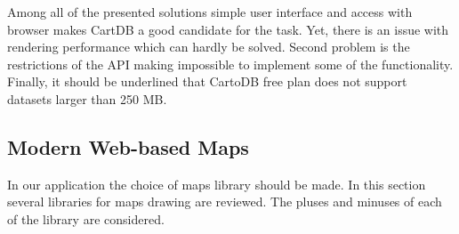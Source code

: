 Among all of the presented solutions simple user interface and access with browser makes CartDB a
good candidate for the task. Yet, there is an issue with rendering performance which can hardly  be
solved. Second problem is the restrictions of the API making impossible to implement some of the
functionality. Finally, it should be underlined that CartoDB free plan does not support datasets
larger than 250 MB.

\subsection{Modern Web-based Maps}
In our application the choice of maps library should be made. In this section several
libraries for maps drawing are reviewed. The pluses and minuses of each of the
library are considered.

